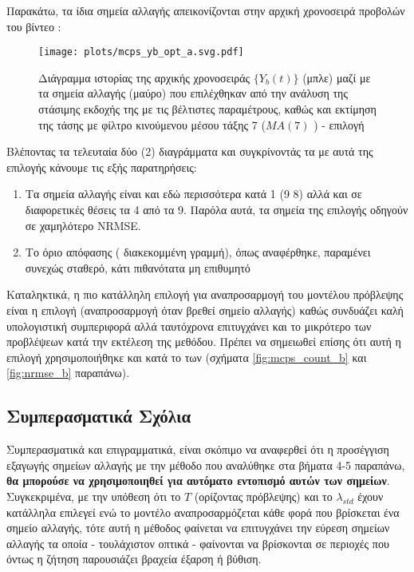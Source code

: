 Παρακάτω, τα ίδια σημεία αλλαγής απεικονίζονται στην αρχική χρονοσειρά προβολών του βίντεο :

\begin{figure}[H]
    \begin{center}
        \texttt{[image: plots/mcps\_yb\_opt\_a.svg.pdf]}
        \caption{Διάγραμμα ιστορίας της αρχικής χρονοσειράς $\{Y_b(t)\}$ (μπλε) μαζί με τα σημεία αλλαγής (μαύρο) που επιλέχθηκαν από την ανάλυση της στάσιμης εκδοχής της με τις βέλτιστες παραμέτρους, καθώς και εκτίμηση της τάσης με φίλτρο κινούμενου μέσου τάξης 7 ($MA(7)$ ) - επιλογή }
        \label{fig:mcps_yb_opt_a}
    \end{center}
\end{figure}

Βλέποντας τα τελευταία δύο (2) διαγράμματα και συγκρίνοντάς τα με αυτά της επιλογής  κάνουμε τις εξής παρατηρήσεις:
\begin{enumerate}
    \item Τα σημεία αλλαγής είναι και εδώ περισσότερα κατά 1 (9  8) αλλά και σε διαφορετικές θέσεις τα 4 από τα 9. Παρόλα αυτά, τα σημεία της επιλογής  οδηγούν σε χαμηλότερο NRMSE.
    \item Το όριο απόφασης ( διακεκομμένη γραμμή), όπως αναφέρθηκε, παραμένει συνεχώς σταθερό, κάτι πιθανότατα μη επιθυμητό
\end{enumerate}

Καταληκτικά, η πιο κατάλληλη επιλογή για αναπροσαρμογή του μοντέλου πρόβλεψης είναι η επιλογή  (αναπροσαρμογή όταν βρεθεί σημείο αλλαγής) καθώς συνδυάζει καλή υπολογιστική συμπεριφορά αλλά ταυτόχρονα επιτυγχάνει και το μικρότερο  των προβλέψεων κατά την εκτέλεση της μεθόδου. Πρέπει να σημειωθεί επίσης ότι αυτή η επιλογή χρησιμοποιήθηκε και κατά το  των  (σχήματα \ref{fig:mcps_count_b} και \ref{fig:nrmse_b} παραπάνω).

\subsection{Συμπερασματικά Σχόλια}

Συμπερασματικά και επιγραμματικά, είναι σκόπιμο να αναφερθεί ότι η προσέγγιση εξαγωγής σημείων αλλαγής με την μέθοδο που αναλύθηκε στα βήματα 4-5 παραπάνω, \textbf{θα μπορούσε να χρησιμοποιηθεί για αυτόματο εντοπισμό αυτών των σημείων}. Συγκεκριμένα, με την υπόθεση ότι το $T$ (ορίζοντας πρόβλεψης) και το $\lambda_{std}$ έχουν κατάλληλα επιλεγεί ενώ το μοντέλο αναπροσαρμόζεται κάθε φορά που βρίσκεται ένα σημείο αλλαγής, τότε αυτή η μέθοδος φαίνεται να επιτυγχάνει την εύρεση σημείων αλλαγής τα οποία - τουλάχιστον οπτικά - φαίνονται να βρίσκονται σε περιοχές που όντως η ζήτηση παρουσιάζει βραχεία έξαρση ή βύθιση.